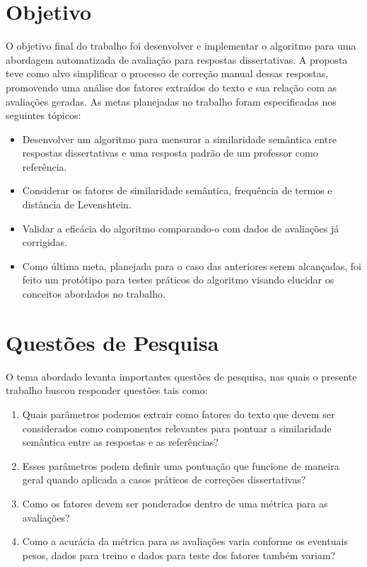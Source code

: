 \section{Objetivo}

O objetivo final do trabalho foi desenvolver e implementar o algoritmo para uma abordagem automatizada de avaliação para respostas dissertativas. A proposta teve como alvo simplificar o processo de correção manual dessas respostas, promovendo uma análise dos fatores extraídos do texto e sua relação com as avaliações geradas. As metas planejadas no trabalho foram especificadas nos seguintes tópicos:

\begin{itemize}
\item Desenvolver um algoritmo para mensurar a similaridade semântica entre respostas dissertativas e uma resposta padrão de um professor como referência.
\item Considerar os fatores de similaridade semântica, frequência de termos e distância de Levenshtein.
\item Validar a eficácia do algoritmo comparando-o com dados de avaliações já corrigidas.
\item Como última meta, planejada para o caso das anteriores serem alcançadas, foi feito um protótipo para testes práticos do algoritmo visando elucidar os conceitos abordados no trabalho.
\end{itemize}


\section{Questões de Pesquisa}

O tema abordado levanta importantes questões de pesquisa, nas quais o presente trabalho buscou responder questões tais como:

\begin{enumerate}
\item Quais parâmetros podemos extrair como fatores do texto que devem ser considerados como componentes relevantes para pontuar a similaridade semântica entre as respostas e as referências?
\item Esses parâmetros podem definir uma pontuação que funcione de maneira geral quando aplicada a casos práticos de correções dissertativas?
\item Como os fatores devem ser ponderados dentro de uma métrica para as avaliações?
\item Como a acurácia da métrica para as avaliações varia conforme os eventuais pesos, dados para treino e dados para teste dos fatores também variam?
\end{enumerate}

